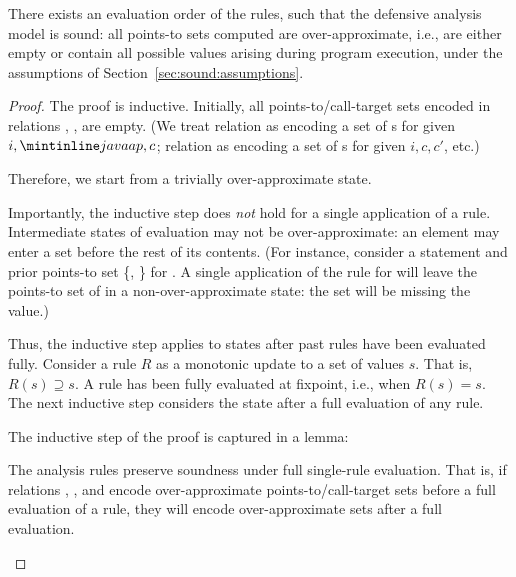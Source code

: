 \begin{theorem}
There exists an evaluation order of the rules, such that the defensive analysis model is sound: all points-to sets computed are over-approximate, i.e., are either empty or contain all possible values arising during program execution, under the assumptions of Section~\ref{sec:sound:assumptions}.

\begin{proof}
The proof is inductive. Initially, all points-to/call-target sets encoded in relations \apinRAW{}, \apoutRAW{}, \calls{}{}{}{} are empty. (We treat relation  as encoding a set of s for given $i,\code{ap},c$; relation  as encoding a set of s for given $i, c, c'$, etc.)

Therefore, we start from a trivially over-approximate state.

Importantly, the inductive step does \emph{not} hold for a single application of a rule. Intermediate states of evaluation may not be over-approximate: an element may enter a set before the rest of its contents. (For instance, consider a statement  and prior points-to set \{, \} for . A single application of the  rule for  will leave the points-to set of  in a non-over-approximate state: the set will be missing the  value.)

Thus, the inductive step applies to states after past rules have been evaluated fully. Consider a rule $R$ as a monotonic update to a set of values $s$. That is, $R(s) \supseteq s$. A rule has been fully evaluated at fixpoint, i.e., when $R(s) = s$. The next inductive step considers the state after a full evaluation of any rule.

The inductive step of the proof is captured in a lemma:

\begin{lemma}
The analysis rules preserve soundness under full single-rule evaluation. That is, if relations \apinRAW{}, \apoutRAW{}, and \calls{}{}{}{} encode over-approximate points-to/call-target sets before a full evaluation of a rule, they will encode over-approximate sets after a full evaluation.
\label{lemma:sound:rule}
\end{lemma}


\end{proof}
\end{theorem}
